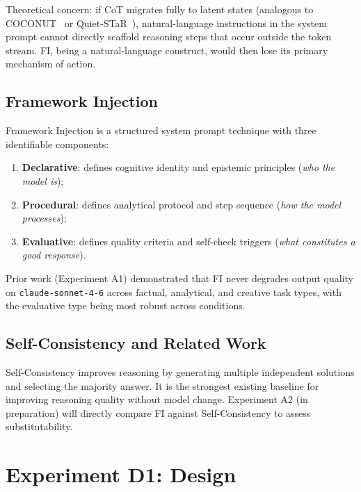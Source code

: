 \documentclass[11pt,a4paper]{article}
\begin{document}
Theoretical concern: if CoT migrates fully to latent states (analogous to
COCONUT~\citep{hao2024training} or Quiet-STaR~\citep{zelikman2024quietstar}),
natural-language instructions in the system prompt cannot directly scaffold
reasoning steps that occur outside the token stream. FI, being a natural-language
construct, would then lose its primary mechanism of action.

\subsection{Framework Injection}

Framework Injection \citep{gomes2025fi} is a structured system prompt technique
with three identifiable components:
\begin{enumerate}
  \item \textbf{Declarative}: defines cognitive identity and epistemic principles
    (\emph{who the model is});
  \item \textbf{Procedural}: defines analytical protocol and step sequence
    (\emph{how the model processes});
  \item \textbf{Evaluative}: defines quality criteria and self-check triggers
    (\emph{what constitutes a good response}).
\end{enumerate}

Prior work (Experiment A1) demonstrated that FI never degrades output quality
on \texttt{claude-sonnet-4-6} across factual, analytical, and creative task types,
with the evaluative type being most robust across conditions.

\subsection{Self-Consistency and Related Work}

Self-Consistency \citep{wang2022selfconsistency} improves reasoning by generating
multiple independent solutions and selecting the majority answer. It is the
strongest existing baseline for improving reasoning quality without model change.
Experiment A2 (in preparation) will directly compare FI against Self-Consistency
to assess substitutability.

\section{Experiment D1: Design}
\end{document}
